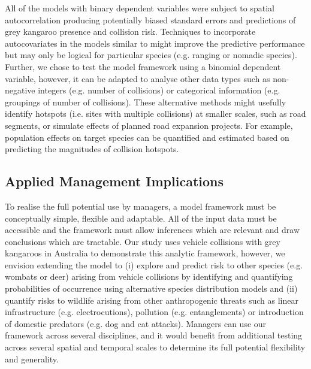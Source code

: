 All of the models with binary dependent variables were subject to spatial autocorrelation producing potentially biased standard errors and predictions of grey kangaroo presence and collision risk. Techniques to incorporate autocovariates in the models similar to \cite{cras12} might improve the predictive performance but may only be logical for particular species (e.g. ranging or nomadic species). Further, we chose to test the model framework using a binomial dependent variable, however, it can be adapted to analyse other data types such as non-negative integers (e.g. number of collisions) or categorical information (e.g. groupings of number of collisions). These alternative methods might usefully identify hotspots (i.e. sites with multiple collisions) at smaller scales, such as road segments, or simulate effects of planned road expansion projects. For example, population effects on target species can be quantified and estimated based on predicting the magnitudes of collision hotspots.
 
\subsection{Applied Management Implications}
To realise the full potential use by managers, a model framework must be conceptually simple, flexible and adaptable. All of the input data must be accessible and the framework must allow inferences which are relevant and draw conclusions which are tractable. Our study uses vehicle collisions with grey kangaroos in Australia to demonstrate this analytic framework, however, we envision extending the model to (i) explore and predict risk to other species (e.g. wombats or deer) arising from vehicle collisions by identifying and quantifying probabilities of occurrence using alternative species distribution models and (ii) quantify risks to wildlife arising from other anthropogenic threats such as linear infrastructure (e.g. electrocutions), pollution (e.g. entanglements) or introduction of domestic predators (e.g. dog and cat attacks). Managers can use our framework across several disciplines, and it would benefit from additional testing across several spatial and temporal scales to determine its full potential flexibility and generality.